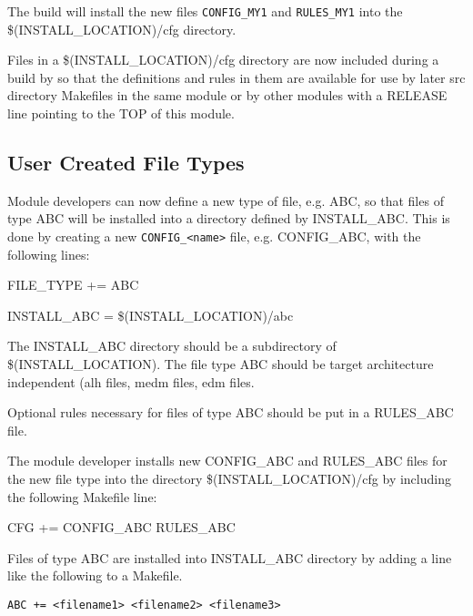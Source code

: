 The build will install the new files \verb|CONFIG_MY1| and \verb|RULES_MY1| into the \$(INSTALL\_LOCATION)/cfg directory.

Files in a \$(INSTALL\_LOCATION)/cfg directory are now included during a build by so that the definitions and rules in 
them are available for use by later src directory Makefiles in the same module or by other modules with a RELEASE line 
pointing to the TOP of this module.

\subsection{User Created File Types}

Module developers can now define a new type of file, e.g. ABC, so that files of type ABC will be installed into a directory 
defined by INSTALL\_ABC. This is done by creating a new \verb|CONFIG_<name>| file, e.g. CONFIG\_ABC, with the 
following lines:

\begin{description}
\item {}FILE\_TYPE += ABC

\item INSTALL\_ABC = \$(INSTALL\_LOCATION)/abc

\end{description}

The INSTALL\_ABC directory should be a subdirectory of \$(INSTALL\_LOCATION). The file type ABC should be 
target architecture independent (alh files, medm files, edm files.

Optional rules necessary for files of type ABC should be put in a RULES\_ABC file.

The module developer installs new CONFIG\_ABC and RULES\_ABC files for the new file type into the directory 
\$(INSTALL\_LOCATION)/cfg by including the following Makefile line:

\begin{description}
\item {}CFG += CONFIG\_ABC RULES\_ABC

\end{description}

Files of type ABC are installed into INSTALL\_ABC directory by adding a line like the following to a Makefile.

\begin{description}
\item \verb|ABC += <filename1> <filename2> <filename3>|

\end{description}

